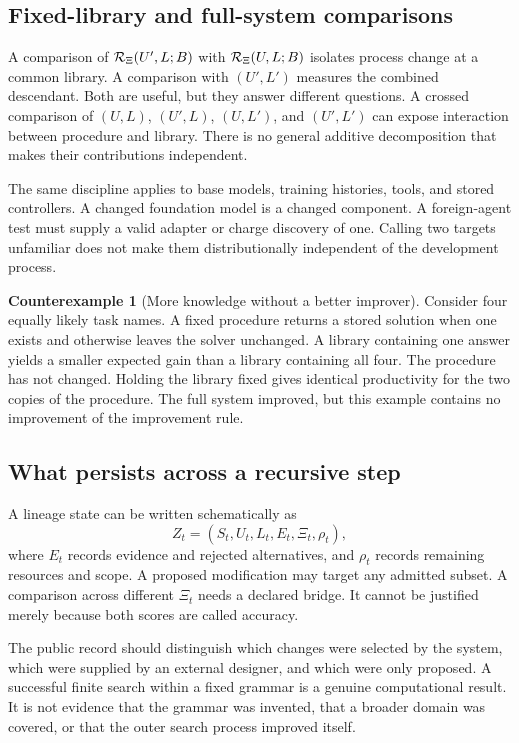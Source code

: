 \documentclass[11pt,letterpaper]{article}
\theoremstyle{plain}
\theoremstyle{definition}
\newtheorem{counterexample}[theorem]{Counterexample}
\begin{document}
\subsection{Fixed-library and full-system comparisons}
A comparison of $\mathcal R_\Xi(U',L;B)$ with $\mathcal R_\Xi(U,L;B)$ isolates process change at a common library. A comparison with $(U',L')$ measures the combined descendant. Both are useful, but they answer different questions. A crossed comparison of $(U,L)$, $(U',L)$, $(U,L')$, and $(U',L')$ can expose interaction between procedure and library. There is no general additive decomposition that makes their contributions independent.

The same discipline applies to base models, training histories, tools, and stored controllers. A changed foundation model is a changed component. A foreign-agent test must supply a valid adapter or charge discovery of one. Calling two targets unfamiliar does not make them distributionally independent of the development process.

\begin{counterexample}[More knowledge without a better improver]\label{ex:library}
Consider four equally likely task names. A fixed procedure returns a stored solution when one exists and otherwise leaves the solver unchanged. A library containing one answer yields a smaller expected gain than a library containing all four. The procedure has not changed. Holding the library fixed gives identical productivity for the two copies of the procedure. The full system improved, but this example contains no improvement of the improvement rule.
\end{counterexample}

\subsection{What persists across a recursive step}
A lineage state can be written schematically as
\[
Z_t=(S_t,U_t,L_t,E_t,\Xi_t,\rho_t),
\]
where $E_t$ records evidence and rejected alternatives, and $\rho_t$ records remaining resources and scope. A proposed modification may target any admitted subset. A comparison across different $\Xi_t$ needs a declared bridge. It cannot be justified merely because both scores are called accuracy.

The public record should distinguish which changes were selected by the system, which were supplied by an external designer, and which were only proposed. A successful finite search within a fixed grammar is a genuine computational result. It is not evidence that the grammar was invented, that a broader domain was covered, or that the outer search process improved itself.
\end{document}
